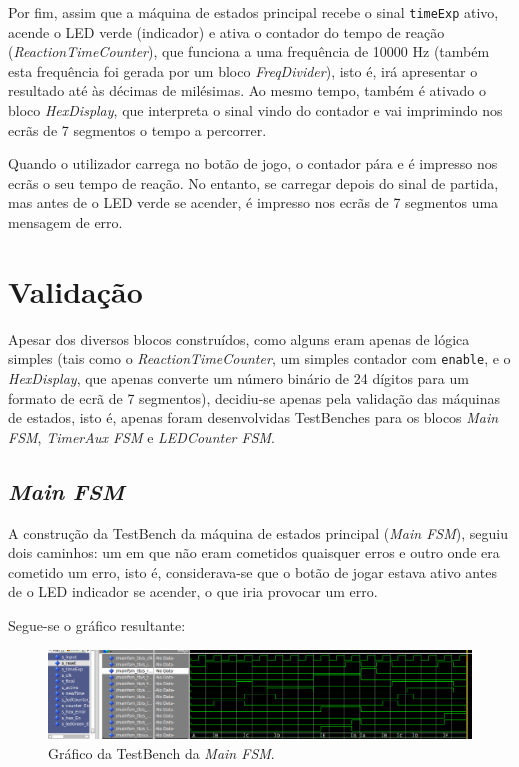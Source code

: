 \documentclass[a4paper,11pt,onecolumn]{report}
\begin{document}
Por fim, assim que a máquina de estados principal recebe o sinal \texttt{timeExp} ativo, acende o LED verde (indicador) e ativa o contador do tempo de reação (\textit{ReactionTimeCounter}), que funciona a uma frequência de 10000 Hz (também esta frequência foi gerada por um bloco \textit{FreqDivider}), isto é, irá apresentar o resultado até às décimas de milésimas. Ao mesmo tempo, também é ativado o bloco \textit{HexDisplay}, que interpreta o sinal vindo do contador e vai imprimindo nos ecrãs de 7 segmentos o tempo a percorrer.

Quando o utilizador carrega no botão de jogo, o contador pára e é impresso nos ecrãs o seu tempo de reação. No entanto, se carregar depois do sinal de partida, mas antes de o LED verde se acender, é impresso nos ecrãs de 7 segmentos uma mensagem de erro.

\section{Validação}

Apesar dos diversos blocos construídos, como alguns eram apenas de lógica simples (tais como o \textit{ReactionTimeCounter}, um simples contador com \texttt{enable}, e o \textit{HexDisplay}, que apenas converte um número binário de 24 dígitos para um formato de ecrã de 7 segmentos), decidiu-se apenas pela validação das máquinas de estados, isto é, apenas foram desenvolvidas TestBenches para os blocos \textit{Main FSM}, \textit{TimerAux FSM} e \textit{LEDCounter FSM}.

\subsection{\textit{Main FSM}}
A construção da TestBench da máquina de estados principal (\textit{Main FSM}), seguiu dois caminhos: um em que não eram cometidos quaisquer erros e outro onde era cometido um erro, isto é, considerava-se que o botão de jogar estava ativo antes de o LED indicador se acender, o que iria provocar um erro.

Segue-se o gráfico resultante:

\begin{figure}[h]
\centerline{\includegraphics[scale=0.33]{Images/MainFSMTB}}
\caption{Gráfico da TestBench da \textit{Main FSM}.}
\label{figmainfsmtb}
\end{figure}
\end{document}
